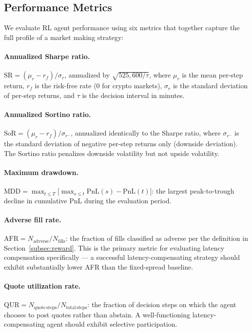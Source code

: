 \documentclass[12pt]{article}
\begin{document}
\subsection{Performance Metrics}
\label{subsec:metrics}

We evaluate RL agent performance using six metrics that together capture the full profile of a market making strategy:

\paragraph{Annualized Sharpe ratio.}
$\mathrm{SR} = (\mu_r - r_f) / \sigma_r$, annualized by $\sqrt{525{,}600/\tau}$, where $\mu_r$ is the mean per-step return, $r_f$ is the risk-free rate (0 for crypto markets), $\sigma_r$ is the standard deviation of per-step returns, and $\tau$ is the decision interval in minutes.

\paragraph{Annualized Sortino ratio.}
$\mathrm{SoR} = (\mu_r - r_f) / \sigma_{r^-}$, annualized identically to the Sharpe ratio, where $\sigma_{r^-}$ is the standard deviation of negative per-step returns only (downside deviation). The Sortino ratio penalizes downside volatility but not upside volatility.

\paragraph{Maximum drawdown.}
$\mathrm{MDD} = \max_{t \leq T} \bigl[\max_{s \leq t} \mathrm{PnL}(s) - \mathrm{PnL}(t)\bigr]$: the largest peak-to-trough decline in cumulative PnL during the evaluation period.

\paragraph{Adverse fill rate.}
$\mathrm{AFR} = N_{\mathrm{adverse}} / N_{\mathrm{fills}}$: the fraction of fills classified as adverse per the definition in Section~\ref{subsec:reward}. This is the primary metric for evaluating latency compensation specifically --- a successful latency-compensating strategy should exhibit substantially lower AFR than the fixed-spread baseline.

\paragraph{Quote utilization rate.}
$\mathrm{QUR} = N_{\mathrm{quote\,steps}} / N_{\mathrm{total\,steps}}$: the fraction of decision steps on which the agent chooses to post quotes rather than abstain. A well-functioning latency-compensating agent should exhibit selective participation.
\end{document}
